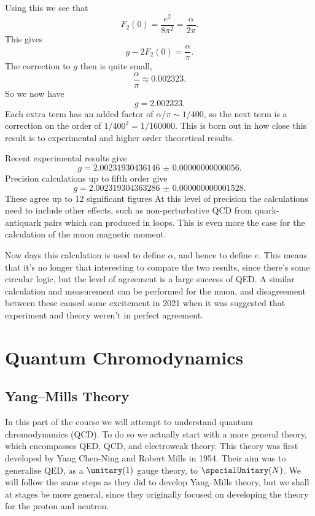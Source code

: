 \documentclass[fleqn]{NotesClass}
\begin{document}
    Using this we see that
    \begin{equation}
        F_2(0) = \frac{e^2}{8\pi^2} = \frac{\alpha}{2\pi}.
    \end{equation}	
    This gives
    \begin{equation}
        g - 2F_2(0) = \frac{\alpha}{\pi}.
    \end{equation}
    The correction to \(g\) then is quite small,
    \begin{equation}
        \frac{\alpha}{\pi} \approx 0.002323.
    \end{equation}
    So we now have
    \begin{equation}
        g = 2.002323.
    \end{equation}
    Each extra term has an added factor of \(\alpha/\pi \sim 1/400\), so the next term is a correction on the order of \(1/400^2 = 1/160000\).
    This is born out in how close this result is to experimental and higher order theoretical results.
    
    Recent experimental results give
    \begin{equation}
        g = \num{2.00231930436146(56)}.
    \end{equation}
    Precision calculations up to fifth order give
    \begin{equation}
        g = \num{2.002319304363286(1528)}.
    \end{equation}
    These agree up to 12 significant figures
    At this level of precision the calculations need to include other effects, such as non-perturbative QCD from quark-antiquark pairs which can produced in loops.
    This is even more the case for the calculation of the muon magnetic moment.
    
    Now days this calculation is used to define \(\alpha\), and hence to define \(e\).
    This means that it's no longer that interesting to compare the two results, since there's some circular logic, but the level of agreement is a large success of QED.
    A similar calculation and measurement can be performed for the muon, and disagreement between these caused some excitement in 2021 when it was suggested that experiment and theory weren't in perfect agreement.
    
    
    \part{Quantum Chromodynamics}
    \chapter{Yang--Mills Theory}
    In this part of the course we will attempt to understand quantum chromodynamics (QCD).
    To do so we actually start with a more general theory, which encompasses QED, QCD, and electroweak theory.
    This theory was first developed by Yang Chen-Ning and Robert Mills in 1954.
    Their aim was to generalise QED, as a \(\unitary(1)\) gauge theory, to \(\specialUnitary(N)\).
    We will follow the same steps as they did to develop Yang--Mills theory, but we shall at stages be more general, since they originally focused on developing the theory for the proton and neutron.
    
\end{document}
